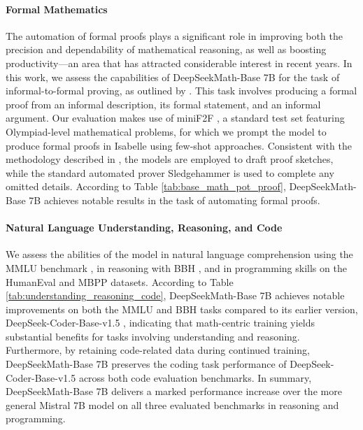\begin{itemize}[topsep=0pt]
\paragraph{Formal Mathematics}

The automation of formal proofs plays a significant role in improving both the precision and dependability of mathematical reasoning, as well as boosting productivity—an area that has attracted considerable interest in recent years. In this work, we assess the capabilities of DeepSeekMath-Base 7B for the task of informal-to-formal proving, as outlined by \citep{dsp_proof}. This task involves producing a formal proof from an informal description, its formal statement, and an informal argument. Our evaluation makes use of miniF2F \citep{minif2f}, a standard test set featuring Olympiad-level mathematical problems, for which we prompt the model to produce formal proofs in Isabelle using few-shot approaches. Consistent with the methodology described in \cite{dsp_proof}, the models are employed to draft proof sketches, while the standard automated prover Sledgehammer \citep{sledgehammer} is used to complete any omitted details. According to Table \ref{tab:base_math_pot_proof}, DeepSeekMath-Base 7B achieves notable results in the task of automating formal proofs.

\paragraph{Natural Language Understanding, Reasoning, and Code}

We assess the abilities of the model in natural language comprehension using the MMLU benchmark \citep{mmlu}, in reasoning with BBH \citep{bbh}, and in programming skills on the HumanEval \citep{codex} and MBPP \citep{mbpp} datasets. According to Table \ref{tab:understanding_reasoning_code}, DeepSeekMath-Base 7B achieves notable improvements on both the MMLU and BBH tasks compared to its earlier version, DeepSeek-Coder-Base-v1.5 \citep{deepseek-coder}, indicating that math-centric training yields substantial benefits for tasks involving understanding and reasoning. Furthermore, by retaining code-related data during continued training, DeepSeekMath-Base 7B preserves the coding task performance of DeepSeek-Coder-Base-v1.5 across both code evaluation benchmarks. In summary, DeepSeekMath-Base 7B delivers a marked performance increase over the more general Mistral 7B model \citep{mistral} on all three evaluated benchmarks in reasoning and programming.


\end{itemize}
